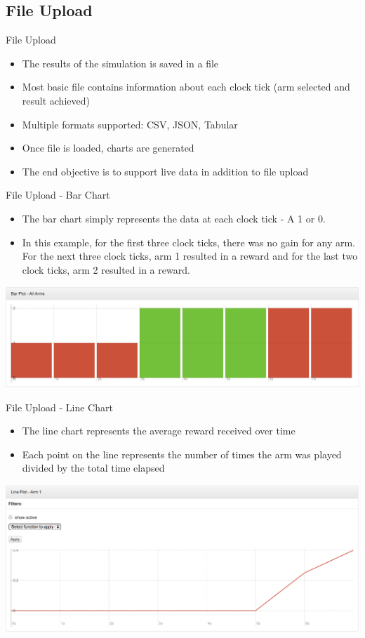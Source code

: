 \documentclass{beamer}
\begin{document}
\subsection{File Upload}
\begin{frame}{File Upload}
 	\begin{itemize}
   		\item The results of the simulation is saved in a file
		\item Most basic file contains information about each clock tick (arm selected and result achieved)
		\item Multiple formats supported: CSV, JSON, Tabular
		\item Once file is loaded, charts are generated
		\item The end objective is to support live data in addition to file upload
	\end{itemize}
\end{frame}

\begin{frame}{File Upload - Bar Chart}
\begin{itemize}
\item The bar chart simply represents the data at each clock tick - A 1 or 0. 
\item In this example, for the first three clock ticks, there was no gain for any arm. For the next three clock ticks, arm 1 resulted in a reward and for the last two clock ticks, arm 2 resulted in a reward.
\end{itemize}
\includegraphics[scale=0.25]{barchart.png}
\end{frame}

\begin{frame}{File Upload - Line Chart}
\begin{itemize}
\item The line chart represents the average reward received over time
\item Each point on the line represents the number of times the arm was played divided by the total time elapsed
\end{itemize}
\includegraphics[scale=0.25]{linechart.png}
\end{frame}
\end{document}
